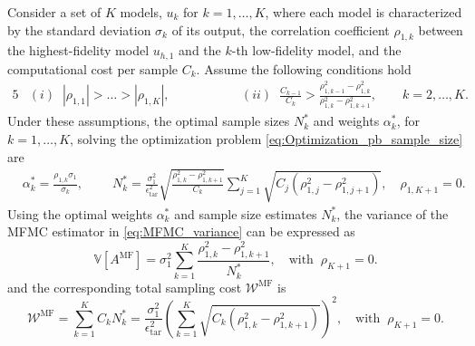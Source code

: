 %
\begin{theorem}
\label{thm:Sample_size_est}
Consider a set of $K$ models, $u_k$ for $k=1,\ldots,K$, where each model is characterized by the standard deviation $\sigma_k$ of its output, the correlation coefficient $\rho_{1,k}$ between the highest-fidelity model $u_{h,1}$ and the $k$-th low-fidelity model, and the computational cost per sample $C_k$. Assume the following conditions hold
%
\begin{alignat*}{5}
    &(i)\;\; |\rho_{1,1}|>\ldots>|\rho_{1,K}|,& \qquad \qquad
    &(ii)\;\; \frac{C_{k-1}}{C_k}>\frac{\rho_{1,k-1}^2-\rho_{1,k}^2}{\rho_{1,k}^2-\rho_{1,k+1}^2},\quad \quad k=2,\ldots,K.
\end{alignat*}
%
Under these assumptions, the optimal sample sizes $N_k^*$ and weights $\alpha_k^*$, for $k=1,\ldots, K$, solving the optimization problem \eqref{eq:Optimization_pb_sample_size} are
%
\begin{align}
    \label{eq:MFMC_SampleSize}
    &\alpha_k^*=\frac{\rho_{1,k}\sigma_1}{\sigma_k},\qquad \;N_k^*=\frac{\sigma_1^2}{\epsilon_\text{tar}^2}\sqrt{\frac{\rho_{1,k}^2-\rho_{1,k+1}^2}{C_k}}\sum_{j=1}^K\sqrt{C_j\left(\rho_{1,j}^2-\rho_{1,j+1}^2\right)}, \quad \rho_{1,K+1}=0.
\end{align}
%
Using the optimal weights $\alpha_k^*$ and sample size estimates $N_k^*$, the variance of the MFMC estimator in \eqref{eq:MFMC_variance} can be expressed as
%
\begin{equation}
\label{eq:MFMC_variance_optimal}
\mathbb{V}\left[A^{\text{MF}}\right] =
\sigma_1^2 \sum_{k=1}^K\frac{\rho_{1,k}^2 - \rho_{1,k+1}^2}{N_k^*},\quad \text{with}\;\;\rho_{K+1}=0.
\end{equation}
%
and the corresponding total sampling cost $\mathcal{W}^\text{MF}$ is
%
\begin{equation}\label{eq:MFMC_sampling_cost}
    \mathcal{W}^\text{MF} = \sum_{k=1}^K C_k N_k^* = \frac{\sigma_1^2}{\epsilon_{\text{tar}}^2}\left(\sum_{k=1}^K\sqrt{C_k\left(\rho_{1,k}^2 - \rho_{1,k+1}^2\right)}\right)^2,\quad \text{with}\;\;\rho_{K+1}=0.
\end{equation}
%
\end{theorem}



